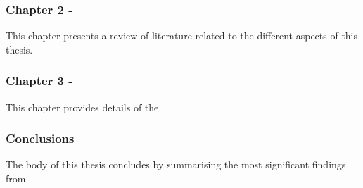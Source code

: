     \subsubsection*{Chapter 2 -}

      This chapter presents a review of literature related to the different aspects of this thesis. 

    \subsubsection*{Chapter 3 - }

      This chapter provides details of the 

    \subsubsection*{Conclusions}

      The body of this thesis concludes by summarising the most significant findings from
